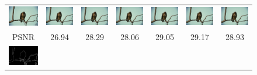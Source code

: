\documentclass[10pt,twocolumn,letterpaper]{article}
\begin{document}
\begin{figure} [tb]
\begin{tabular*}{0.5\textwidth}{ccccccc}
  \hspace{-2mm}
  \includegraphics[width=2cm]{fig/42049_g.jpg} & \hspace{-4mm}
  \includegraphics[width=2cm]{fig/42049[2-Bicubic]_g.jpg} & \hspace{-4mm}
  \includegraphics[width=2cm]{fig/42049[3-Zeyde]_g.jpg} & \hspace{-4mm}
  \includegraphics[width=2cm]{fig/42049[4-ANR]_g.jpg} & \hspace{-4mm}
  \includegraphics[width=2cm]{fig/42049[5-SRCNN]_g.jpg} & \hspace{-4mm}
  \includegraphics[width=2cm]{fig/42049[6-A+]_g.jpg} & \hspace{-4mm}
  \includegraphics[width=2cm]{fig/42049[7-JOR]_g.jpg} \\
  PSNR & 26.94 & 28.29 & 28.06 & 29.05 & 29.17 & 28.93 \\    
  \hspace{-2mm}
  \includegraphics[width=2cm]{fig/42049_seg.jpg} & \hspace{-4mm}

\end{tabular*}
\end{figure}
\end{document}

